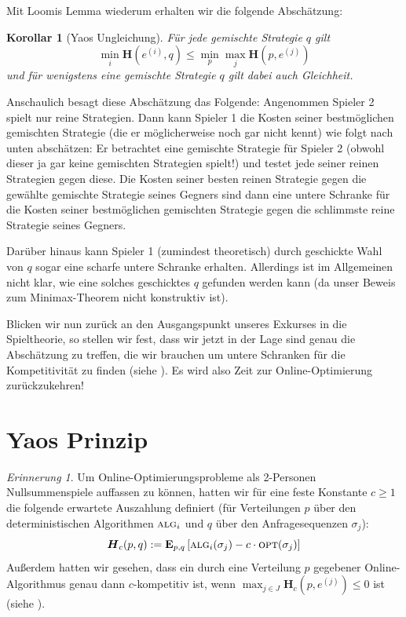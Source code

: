 \documentclass[a4paper,ngerman,12pt,bibtotoc]{scrartcl}
\theoremstyle{definition}
\theoremstyle{plain}
\newtheorem{kor}[defn]{Korollar}
\theoremstyle{remark}
\newtheorem{erin}[defn]{Erinnerung}
\renewcommand{\_}{\mathpunct{.}\,}
\newcommand{\?}{\,{:}\,}
\newcommand{\Alg}{\ensuremath{\textsc{alg}}}
\newcommand{\Opt}{\ensuremath{\textsc{opt}}}
\newcommand{\EE}{\mathbf{E}}
\newcommand{\EH}{\boldsymbol{H}}
\begin{document}
	Mit Loomis Lemma wiederum erhalten wir die folgende Abschätzung:
	
	\begin{kor}[Yaos Ungleichung]\label{kor:YaosUngleichung} 
		Für jede gemischte Strategie $q$ gilt
		\[\min_i\EH(e^{(i)},q) \leq \min_p\max_j\EH(p,e^{(j)})\]
		und für wenigstens eine gemischte Strategie $q$ gilt dabei auch Gleichheit.
	\end{kor}
	
	Anschaulich besagt diese Abschätzung das Folgende: Angenommen Spieler 2 spielt nur reine Strategien. Dann kann Spieler 1 die Kosten seiner bestmöglichen gemischten Strategie (die er möglicherweise noch gar nicht kennt) wie folgt nach unten abschätzen: Er betrachtet eine gemischte Strategie für Spieler 2 (obwohl dieser ja gar keine gemischten Strategien spielt!) und testet jede seiner reinen Strategien gegen diese. Die Kosten seiner besten reinen Strategie gegen die gewählte gemischte Strategie seines Gegners sind dann eine untere Schranke für die Kosten seiner bestmöglichen gemischten Strategie gegen die schlimmste reine Strategie seines Gegners.
	
	Darüber hinaus kann Spieler 1 (zumindest theoretisch) durch geschickte Wahl von $q$ sogar eine scharfe untere Schranke erhalten. Allerdings ist im Allgemeinen nicht klar, wie eine solches geschicktes $q$ gefunden werden kann (da unser Beweis zum Minimax-Theorem nicht konstruktiv ist).

	Blicken wir nun zurück an den Ausgangspunkt unseres Exkurses in die Spieltheorie, so stellen wir fest, dass wir jetzt in der Lage sind genau die Abschätzung zu treffen, die wir brauchen um untere Schranken für die Kompetitivität zu finden (siehe ). Es wird also Zeit zur Online-Optimierung zurückzukehren!
		

	\section{Yaos Prinzip}\label{sec:YaosPrinzip}
	
	\begin{erin}
		Um Online-Optimierungsprobleme als 2-Personen Nullsummenspiele auffassen zu können, hatten wir für eine feste Konstante $c\geq 1$ die folgende erwartete Auszahlung definiert (für Verteilungen $p$ über den deterministischen Algorithmen $\Alg_i$ und $q$ über den Anfragesequenzen $\sigma_j$):
			\[\EH_c(p,q) := \EE_{p,q}\left[\Alg_i(\sigma_j) - c\cdot\Opt(\sigma_j)\right]\]
		Außerdem hatten wir gesehen, dass ein durch eine Verteilung $p$ gegebener Online-Algorithmus genau dann $c$-kompetitiv ist, wenn $\max_{j\in J} \EH_c(p,e^{(j)}) \leq 0$ ist (siehe ).
	\end{erin}
	
\end{document}
